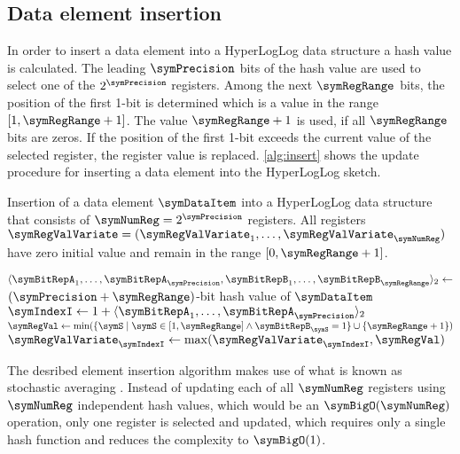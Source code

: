 \documentclass[a4paper]{scrartcl}
\newcommand{\comm}[2]{{\Comment{\parbox[t]{#1\linewidth}{{#2}}}}}
\begin{document}
\subsection{Data element insertion}
\label{sec:data_element_insertion}
In order to insert a data element into a HyperLogLog data structure a hash value is calculated. The leading $\symPrecision$ bits of the hash value are used to select one of the $2^\symPrecision$ registers. Among the next $\symRegRange$ bits, the position of the first 1-bit is determined which is a value in the range $[1,\symRegRange+1]$. The value $\symRegRange+1$ is used, if all $\symRegRange$ bits are zeros. If the position of the first 1-bit exceeds the current value of the selected register, the register value is replaced. \cref{alg:insert} shows the update procedure for inserting a data element into the HyperLogLog sketch.

\begin{algorithm}
\caption{Insertion of a data element $\symDataItem$ into a HyperLogLog data structure that consists of $\symNumReg=2^\symPrecision$ registers. All registers $\boldsymbol{\symRegValVariate} = (\symRegValVariate_1,\ldots,\symRegValVariate_\symNumReg)$ have zero initial value and remain in the range $[0, \symRegRange+1]$.}
\label{alg:insert}
\begin{algorithmic}
\State $\langle \symBitRepA_1, \ldots, \symBitRepA_\symPrecision,\symBitRepB_1,\ldots,\symBitRepB_\symRegRange\rangle_2 \gets$ $(\symPrecision + \symRegRange)$-bit hash value of $\symDataItem$
\State $\symIndexI \gets 1+ \langle \symBitRepA_1, \ldots, \symBitRepA_\symPrecision\rangle_2$
\comm{0.2}{$\symIndexI\in[1,2^\symPrecision]$}
\State $\symRegVal \gets \min(\{\symS\mid \symS \in [1, \symRegRange]  \wedge  \symBitRepB_\symS = 1\}\cup {\{\symRegRange+1\}} )$
\comm{0.2}{$\symRegVal\in[1,\symRegRange+1]$}
\State $\symRegValVariate_\symIndexI \gets\max(\symRegValVariate_\symIndexI, \symRegVal)$
\EndProcedure
\end{algorithmic}
\end{algorithm}

The desribed element insertion algorithm makes use of what is known as stochastic averaging \cite{Flajolet1985}. Instead of updating each of all $\symNumReg$ registers using $\symNumReg$ independent hash values, which would be an $\symBigO(\symNumReg)$ operation, only one register is selected and updated, which requires only a single hash function and reduces the complexity to $\symBigO(1)$.
\end{document}
